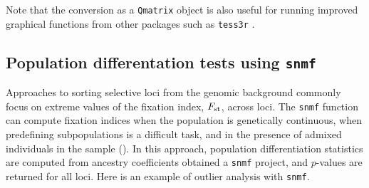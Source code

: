 \documentclass[12pt,a4paper,oneside]{article}\usepackage[]{graphicx}\usepackage[]{color}
\begin{document}
Note that the conversion as a {\tt Qmatrix} object is also useful for running improved graphical functions from other packages such as {\tt tess3r} \citep{Caye_2016}.

\subsection{Population differentation tests using {\tt snmf}}

Approaches to sorting selective loci from the genomic background commonly focus on extreme values of the fixation index, $F_{\rm st}$, across loci. The {\tt snmf} function can compute fixation indices when the population is genetically continuous, when predefining subpopulations is a difficult task, and in the presence of admixed individuals in the sample (\citep{Martins_2016}). In this approach, population differentiation statistics are computed from ancestry coefficients obtained a {\tt snmf} project, and $p$-values are returned for all loci. Here is an example of outlier analysis with {\tt snmf}.
\end{document}

